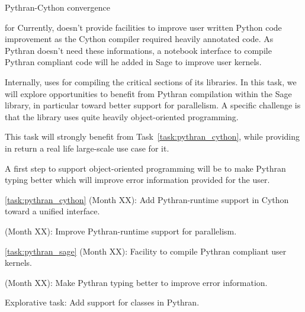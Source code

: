 \begin{Workpackage}{\thewpno}
\begin{task}{Pythran-Cython convergence}
\end{task}

\begin{task}{\Pythran for \Sage}
  \label{task:pythran_sage}
  Currently, \Sage doesn't provide facilities to improve user written Python
  code improvement as the Cython compiler required heavily annotated code. As
  Pythran doesn't need these informations, a notebook interface to compile Pythran
  compliant code will he added in Sage to improve user kernels.

  Internally, \Sage uses \Cython for compiling the critical sections of
  its libraries. In this task, we will explore opportunities to
  benefit from Pythran compilation within the Sage library, in
  particular toward better support for parallelism. A specific
  challenge is that the \Sage library uses quite heavily
  object-oriented programming.

  This task will strongly benefit from Task~\ref{task:pythran_cython},
  while providing in return a real life large-scale use case for it.

  A first step to support object-oriented programming will be to make Pythran
  typing better which will improve error information provided for the user.
\end{task}


\begin{WPDeliverables}
\item
\ref{task:pythran_cython}
(Month XX):
Add Pythran-runtime support in Cython toward a unified interface.
\item
(Month XX):
Improve Pythran-runtime support for parallelism.
\item
\ref{task:pythran_sage}
(Month XX):
Facility to compile Pythran compliant user kernels.
\item
(Month XX):
Make Pythran typing better to improve error information.
\item
Explorative task:
Add support for classes in Pythran.
\end{WPDeliverables}
\end{Workpackage}

